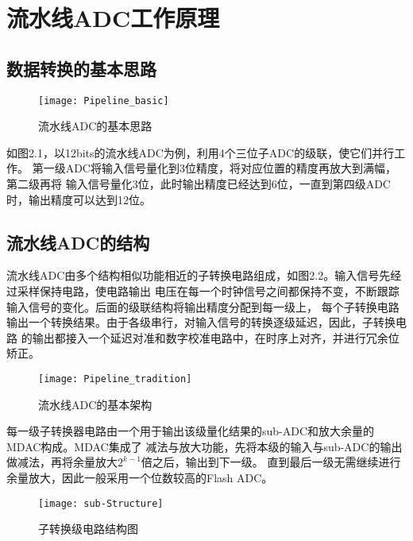 \newpage

\section{流水线ADC工作原理}
\subsection{数据转换的基本思路}
\begin{figure}[ht]
    \centering
    \texttt{[image: Pipeline\_basic]}
    \caption{\label{fig:pip-basic}流水线ADC的基本思路}
\end{figure}
如图2.1，以12bits的流水线ADC为例，利用4个三位子ADC的级联，使它们并行工作。
第一级ADC将输入信号量化到3位精度，将对应位置的精度再放大到满幅，第二级再将
输入信号量化3位，此时输出精度已经达到6位，一直到第四级ADC时，输出精度可以达到12位。

\subsection{流水线ADC的结构}
流水线ADC由多个结构相似功能相近的子转换电路组成，如图2.2。输入信号先经过采样保持电路，使电路输出
电压在每一个时钟信号之间都保持不变，不断跟踪输入信号的变化。后面的级联结构将输出精度分配到每一级上，
每个子转换电路输出一个转换结果。由于各级串行，对输入信号的转换逐级延迟，因此，子转换电路
的输出都接入一个延迟对准和数字校准电路中，在时序上对齐，并进行冗余位矫正。
\begin{figure}[ht]
    \centering
    \texttt{[image: Pipeline\_tradition]}
    \caption{\label{fig:pip-tradition}流水线ADC的基本架构}
\end{figure}
\par 每一级子转换器电路由一个用于输出该级量化结果的sub-ADC和放大余量的MDAC构成。MDAC集成了
减法与放大功能，先将本级的输入与sub-ADC的输出做减法，再将余量放大$ 2^{k-1} $倍之后，输出到下一级。
直到最后一级无需继续进行余量放大，因此一般采用一个位数较高的Flash ADC。
\begin{figure}[ht]
    \centering
    \texttt{[image: sub-Structure]}
    \caption{\label{fig:sub-Structure}子转换级电路结构图}
\end{figure}
